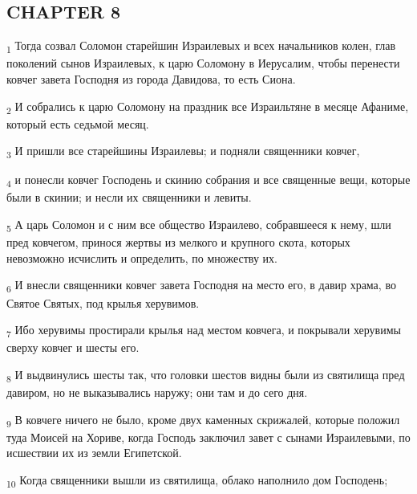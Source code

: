 \subsection{CHAPTER 8}
\begin{tcolorbox}
\textsubscript{1} Тогда созвал Соломон старейшин Израилевых и всех начальников колен, глав поколений сынов Израилевых, к царю Соломону в Иерусалим, чтобы перенести ковчег завета Господня из города Давидова, то есть Сиона.
\end{tcolorbox}
\begin{tcolorbox}
\textsubscript{2} И собрались к царю Соломону на праздник все Израильтяне в месяце Афаниме, который есть седьмой месяц.
\end{tcolorbox}
\begin{tcolorbox}
\textsubscript{3} И пришли все старейшины Израилевы; и подняли священники ковчег,
\end{tcolorbox}
\begin{tcolorbox}
\textsubscript{4} и понесли ковчег Господень и скинию собрания и все священные вещи, которые были в скинии; и несли их священники и левиты.
\end{tcolorbox}
\begin{tcolorbox}
\textsubscript{5} А царь Соломон и с ним все общество Израилево, собравшееся к нему, шли пред ковчегом, принося жертвы из мелкого и крупного скота, которых невозможно исчислить и определить, по множеству их.
\end{tcolorbox}
\begin{tcolorbox}
\textsubscript{6} И внесли священники ковчег завета Господня на место его, в давир храма, во Святое Святых, под крылья херувимов.
\end{tcolorbox}
\begin{tcolorbox}
\textsubscript{7} Ибо херувимы простирали крылья над местом ковчега, и покрывали херувимы сверху ковчег и шесты его.
\end{tcolorbox}
\begin{tcolorbox}
\textsubscript{8} И выдвинулись шесты так, что головки шестов видны были из святилища пред давиром, но не выказывались наружу; они там и до сего дня.
\end{tcolorbox}
\begin{tcolorbox}
\textsubscript{9} В ковчеге ничего не было, кроме двух каменных скрижалей, которые положил туда Моисей на Хориве, когда Господь заключил завет с сынами Израилевыми, по исшествии их из земли Египетской.
\end{tcolorbox}
\begin{tcolorbox}
\textsubscript{10} Когда священники вышли из святилища, облако наполнило дом Господень;
\end{tcolorbox}
